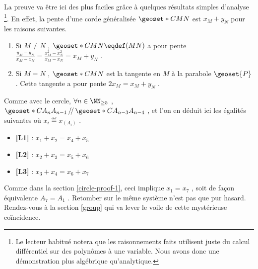 \vspace{1em}

 


La preuve va être ici des plus faciles grâce à quelques résultats simples d'analyse
\footnote{
	Le lecteur habitué notera que les raisonnements faits utilisent juste du calcul différentiel sur des polynômes à une variable. Nous avons donc une démonstration plus algébrique qu'analytique.
}.
En effet, la pente d'une corde généralisée $\geoset*{C}{MN}$ est $x_M + y_N$ pour les raisons suivantes.
\begin{enumerate}
	\item Si $M \neq N$ , $\geoset*{C}{MN} \eqdef (MN)$ a pour pente $\frac{y_M - y_N}{x_M - x_N} = \frac{x_M^2 - x_N^2}{x_M - x_N} = x_M + y_N$ .

	\item Si $M = N$ , $\geoset*{C}{MN}$ est la tangente en $M$ à la parabole $\geoset{P}$ . Cette tangente a pour pente $2 x_M = x_M + y_N$ .
\end{enumerate}


\medskip

Comme avec le cercle, $\forall n \in \NN_{\geq 5}$ , 
$\geoset*{C}{A_{n} A_{n-1}} \,/\!/\, \geoset*{C}{A_{n-3} A_{n-4}}$ , et l'on en déduit ici les égalités suivantes où $x_i \eqdef x_{(A_i)}$ .
\begin{itemize}[label=\small\textbullet]
	\item \textbf{[L1]} : 
	      $x_1 + x_{2} = x_{4} + x_{5}$

	\item \textbf{[L2]} : 
	      $x_2 + x_{3} = x_{5} + x_{6}$

	\item \textbf{[L3]} : 
	      $x_3 + x_{4} = x_{6} + x_{7}$
\end{itemize}


\medskip

Comme dans la section \ref{circle-proof-1}, ceci implique $x_1 = x_7$ , soit de façon équivalente $A_7 = A_1$ . Retomber sur le même système n'est pas que pur hasard. Rendez-vous à la section \ref{group} qui va lever le voile de cette mystérieuse coïncidence.
